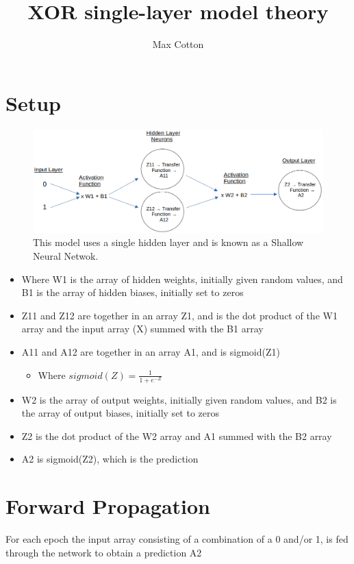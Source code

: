 \documentclass[10pt,a4paper]{article}
\title{XOR single-layer model theory}
\author{Max Cotton}
\date{}
\begin{document}
\maketitle

\section{Setup}

\begin{figure}[h!]
\centering
\includegraphics[width=1\textwidth]{src/images/xor-ann-diagram.png}
\caption{This model uses a single hidden layer and is known as a Shallow Neural Netwok.}
\end{figure}

\begin{itemize}
    \item Where W1 is the array of hidden weights, initially given random values, and B1 is the array of hidden biases, initially set to zeros
    \item Z11 and Z12 are together in an array Z1, and is the dot product of the W1 array and the input array (X) summed with the B1 array
    \item A11 and A12 are together in an array A1, and is sigmoid(Z1)
    \begin{itemize}
        \item Where $sigmoid(Z) = \frac{1}{1+e^{-Z}}$
    \end{itemize}
    \item W2 is the array of output weights, initially given random values, and B2 is the array of output biases, initially set to zeros
    \item Z2 is the dot product of the W2 array and A1 summed with the B2 array
    \item A2 is sigmoid(Z2), which is the prediction
\end{itemize}

\section{Forward Propagation}
For each epoch the input array consisting of a combination of a 0 and/or 1, is fed through the network to obtain a prediction A2
\end{document}
